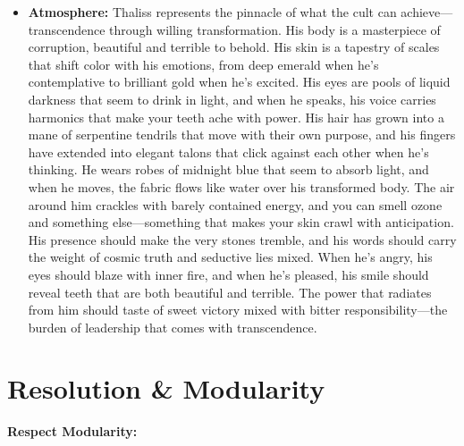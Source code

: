 \documentclass[11pt]{article}
\begin{document}
\begin{itemize}
\begin{itemize}
\begin{itemize}
\begin{itemize}
  \item \textbf{Atmosphere:} Thaliss represents the pinnacle of what the cult can achieve—transcendence through willing transformation. His body is a masterpiece of corruption, beautiful and terrible to behold. His skin is a tapestry of scales that shift color with his emotions, from deep emerald when he's contemplative to brilliant gold when he's excited. His eyes are pools of liquid darkness that seem to drink in light, and when he speaks, his voice carries harmonics that make your teeth ache with power. His hair has grown into a mane of serpentine tendrils that move with their own purpose, and his fingers have extended into elegant talons that click against each other when he's thinking. He wears robes of midnight blue that seem to absorb light, and when he moves, the fabric flows like water over his transformed body. The air around him crackles with barely contained energy, and you can smell ozone and something else—something that makes your skin crawl with anticipation. His presence should make the very stones tremble, and his words should carry the weight of cosmic truth and seductive lies mixed. When he's angry, his eyes should blaze with inner fire, and when he's pleased, his smile should reveal teeth that are both beautiful and terrible. The power that radiates from him should taste of sweet victory mixed with bitter responsibility—the burden of leadership that comes with transcendence.
  \end{itemize}
\end{itemize}

\section{Resolution \& Modularity}

\textbf{Respect Modularity:}
\end{itemize}
\end{itemize}
\end{document}
